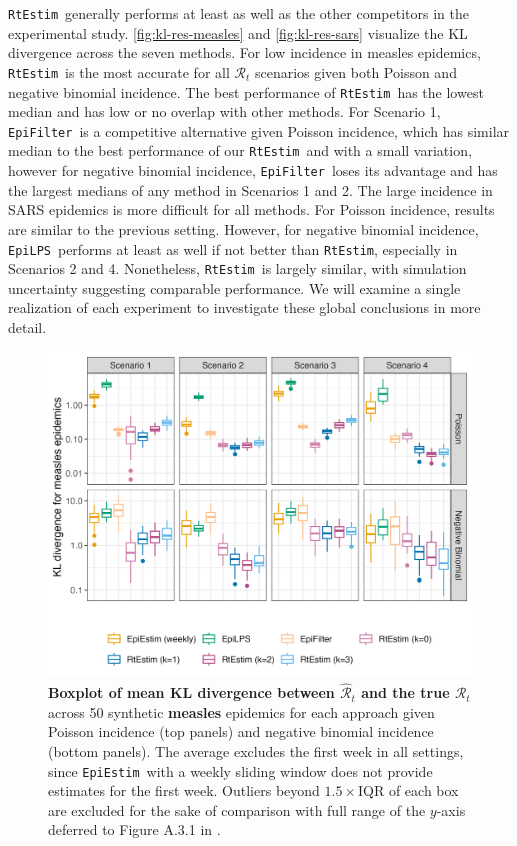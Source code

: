 \documentclass[10pt,letterpaper]{article}
\def\RtEstim{\texttt{RtEstim}}
\def\EpiEstim{\texttt{EpiEstim}}
\def\EpiLPS{\texttt{EpiLPS}}
\def\EpiFilter{\texttt{EpiFilter}}
\def\calR{\mathcal{R}}
\renewcommand{\hat}{\widehat}
\begin{document}
\RtEstim\ generally performs at least as well as the other competitors in the
experimental study. \autoref{fig:kl-res-measles} and \autoref{fig:kl-res-sars}
visualize the KL divergence across the seven methods. For low incidence in
measles epidemics, \RtEstim\ is the most accurate for all $\calR_t$ scenarios
given both Poisson and negative binomial incidence. The best performance of
\RtEstim\ has the lowest median and has low or no overlap with other methods.
For Scenario 1, \EpiFilter\ is a competitive alternative given Poisson
incidence, which has similar median to the best performance of our \RtEstim\ and
with a small variation, however for negative binomial incidence, \EpiFilter\
loses its advantage and has the largest medians of any method in Scenarios 1 and
2. The large incidence in SARS epidemics is more difficult for all methods. For
Poisson incidence, results are similar to the previous setting. However, for
negative binomial incidence, \EpiLPS\ performs at least as well if not better
than \RtEstim, especially in Scenarios 2 and 4. Nonetheless, \RtEstim\ is
largely similar, with simulation uncertainty suggesting comparable performance.
We will examine a single realization of each
experiment to investigate these global conclusions in more detail.

\begin{figure}[!t]
  \centering
  \includegraphics[width=1.0\linewidth]{fig/Fig3.png}
  \caption{{\bf Boxplot of mean KL divergence between $\hat{\calR}_t$ and the true
  $\calR_t$} across 50 synthetic {\bf measles} epidemics for each approach given
  Poisson incidence (top panels) and negative binomial incidence (bottom
  panels). The average excludes the first week in all settings, since
  \EpiEstim\ with a weekly sliding window does not provide estimates for the
  first week. Outliers beyond $1.5\times$IQR of each box are excluded for the
  sake of comparison with full range of the $y$-axis deferred to Figure A.3.1 in
  \nameref{S1_supp}.} 
  \label{fig:kl-res-measles}
\end{figure}
\end{document}
